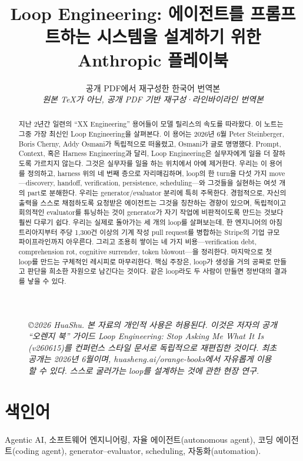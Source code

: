 \documentclass[conference]{IEEEtran}
\title{Loop Engineering: 에이전트를 프롬프트하는 시스템을 설계하기 위한 Anthropic 플레이북}
\author{공개 PDF에서 재구성한 한국어 번역본\\\textit{원본 TeX가 아닌, 공개 PDF 기반 재구성·라인바이라인 번역본}}
\begin{document}
\maketitle

\begin{figure}[!t]
\footnotesize\itshape
\copyright 2026 HuaShu. 본 자료의 개인적 사용은 허용된다. 이것은 저자의 공개 ``오렌지 북'' 가이드 \emph{Loop Engineering: Stop Asking Me What It Is} (v260615)를 컨퍼런스 스타일 문서로 독립적으로 재편집한 것이다. 최초 공개는 2026년 6월이며, huasheng.ai/orange-books에서 자유롭게 이용할 수 있다. 스스로 굴러가는 loop를 설계하는 것에 관한 현장 연구.
\end{figure}

\begin{abstract}
지난 2년간 일련의 ``XX Engineering'' 용어들이 모델 릴리스의 속도를 따라왔다. 이 노트는 그중 가장 최신인 Loop Engineering을 살펴본다. 이 용어는 2026년 6월 Peter Steinberger, Boris Cherny, Addy Osmani가 독립적으로 떠올렸고, Osmani가 글로 명명했다. Prompt, Context, 혹은 Harness Engineering과 달리, Loop Engineering은 실무자에게 일을 더 잘하도록 가르치지 않는다. 그것은 실무자를 일을 하는 위치에서 아예 제거한다. 우리는 이 용어를 정의하고, harness 위의 네 번째 층으로 자리매김하며, loop의 한 turn을 다섯 가지 move---discovery, handoff, verification, persistence, scheduling---와 그것들을 실현하는 여섯 개의 part로 분해한다. 우리는 generator/evaluator 분리에 특히 주목한다. 경험적으로, 자신의 출력을 스스로 채점하도록 요청받은 에이전트는 그것을 칭찬하는 경향이 있으며, 독립적이고 회의적인 evaluator를 튜닝하는 것이 generator가 자기 작업에 비판적이도록 만드는 것보다 훨씬 다루기 쉽다. 우리는 실제로 돌아가는 세 개의 loop를 살펴보는데, 한 엔지니어의 아침 트리아지부터 주당 1{,}300건 이상의 기계 작성 pull request를 병합하는 Stripe의 기업 규모 파이프라인까지 아우른다. 그리고 조용히 쌓이는 네 가지 비용---verification debt, comprehension rot, cognitive surrender, token blowout---을 정리한다. 마지막으로 첫 loop를 만드는 구체적인 레시피로 마무리한다. 핵심 주장은, loop가 생성을 거의 공짜로 만들고 판단을 희소한 자원으로 남긴다는 것이다. 같은 loop라도 두 사람이 만들면 정반대의 결과를 낳을 수 있다.
\end{abstract}

\section*{색인어}
Agentic AI, 소프트웨어 엔지니어링, 자율 에이전트(autonomous agent), 코딩 에이전트(coding agent), generator--evaluator, scheduling, 자동화(automation).
\end{document}
